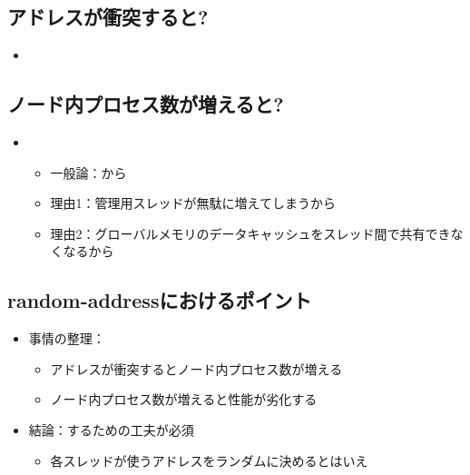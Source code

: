 \documentclass[25pt,papersize,landscape]{jsarticle}
\begin{document}
\subsection{アドレスが衝突すると?}

\begin{itemize}
\item {}
\end{itemize}


\subsection{ノード内プロセス数が増えると?}

\begin{itemize}
\item {}
  \begin{itemize}
  \item 一般論：から
  \item 理由1：管理用スレッドが無駄に増えてしまうから
  \item 理由2：グローバルメモリのデータキャッシュをスレッド間で共有できなくなるから
  \end{itemize}
\end{itemize}


\subsection{random-addressにおけるポイント}

\begin{itemize}
\item 事情の整理：
  \begin{itemize}
  \item アドレスが衝突するとノード内プロセス数が増える
  \item ノード内プロセス数が増えると性能が劣化する
  \end{itemize}
\item 結論：するための工夫が必須
  \begin{itemize}
  \item 各スレッドが使うアドレスをランダムに決めるとはいえ
  \end{itemize}
\end{itemize}
\end{document}
